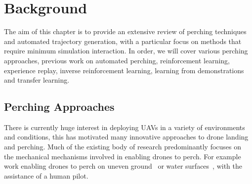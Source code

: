 \chapter{Background}


The aim of this chapter is to provide an extensive review of perching techniques and automated trajectory generation, with a particular focus on methods that require minimum simulation interaction.
In order, we will cover various perching approaches, previous work on automated perching, reinforcement learning, experience replay, inverse reinforcement learning, learning from demonstrations and transfer learning.

\section{Perching Approaches}


There is currently huge interest in deploying UAVs in a variety of environments and conditions, this has motivated many innovative approaches to drone landing and perching.
Much of the existing body of research predominantly focuses on the mechanical mechanisms involved in enabling drones to perch.
For example work enabling drones to perch on uneven ground~\cite{perching-uneven-ground} or water surfaces~\cite{perching-water1,perching-water2}, with the assistance of a human pilot.

